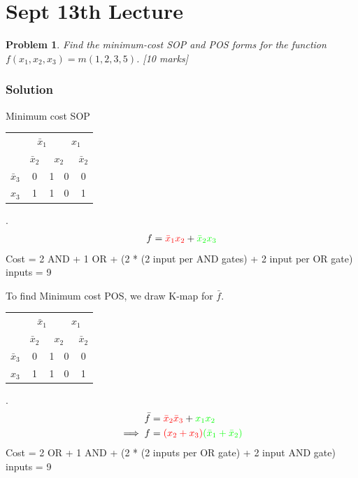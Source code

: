 \documentclass[twocolumn]{article}
\newtheorem{prob}{Problem}
\newcommand{\bx}{\bar{x}}
\newcommand{\cred}{\color{red}}
\newcommand{\cg}{\color{green}}
\begin{document}
\section{Sept 13th Lecture}

\begin{prob}
Find the minimum-cost SOP and POS forms for the function $f(x_1 , x_2 , x_3 ) =
m(1, 2, 3, 5)$. \cite[Prob 2.37]{brown2013fundamentals} [10 marks]
\label{prob:237}
\end{prob}

\subsubsection*{Solution}

Minimum cost SOP
\\
\begin{tabular}{c|c|c|c|c}
  \toprule
  & \multicolumn{2}{c|}{$\bx_1$} & \multicolumn{2}{c}{$x_1$}
  \\
  & $\bx_2$ & \multicolumn{2}{c|}{$x_2$} & $\bx_2$
  \\ \midrule
  $\bx_3$
                                  & 0 & {\color{red}1} & 0 & 0
  \\
  $x_3$
                                  & {\color{green}1} & {\color{red}1} & 0 & {\color{green}1}
  \\\bottomrule
\end{tabular}.
\\
\begin{align}
  f = {\cred \bx_1 x_2} + {\cg \bx_2 x_3}
\end{align}
Cost = 2 AND  + 1 OR + (2 * (2 input per AND gates) + 2 input per OR gate) inputs = 9

To find Minimum cost POS, we draw K-map for $\bar{f}$.
\\
\begin{tabular}{c|c|c|c|c}
  \toprule
  & \multicolumn{2}{c|}{$\bx_1$} & \multicolumn{2}{c}{$x_1$}
  \\
  & $\bx_2$ & \multicolumn{2}{c|}{$x_2$} & $\bx_2$
  \\ \midrule
  $\bx_3$
  & \cred 0 & 1 & \cg 0 & \cred 0
  \\
  $x_3$
  & 1 & 1 & \cg 0 & 1
  \\\bottomrule
\end{tabular}.
\\
\begin{align}
  \bar{f} &= {\cred \bx_2 \bx_3} + {\cg x_1 x_2 }
  \\
  \implies f &= {\cred (x_2 + x_3)}{\cg (\bx_1 + \bx_2) }
\end{align}
Cost = 2 OR + 1 AND + (2 * (2 inputs per OR gate) + 2 input AND gate) inputs = 9
\end{document}
